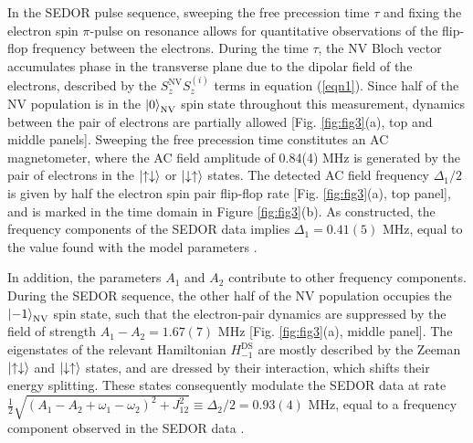 \documentclass[%
 reprint,
 amsmath,amssymb,
 aps,
]{revtex4-1}
\begin{document}
In the SEDOR pulse sequence, sweeping the free precession time $\tau$ and fixing the electron spin $\pi$-pulse on resonance allows for quantitative observations of the flip-flop frequency between the electrons. During the time $\tau$, the NV Bloch vector accumulates phase in the transverse plane due to the dipolar field of the electrons, described by the $S_{z}^{\text{NV}}S_{z}^{(i)}$ terms in equation (\ref{eqn1}). Since half of the NV population is in the $\ket{0}_{\text{NV}}$ spin state throughout this measurement, dynamics between the pair of electrons are partially allowed [Fig. \ref{fig:fig3}(a), top and middle panels]. Sweeping the free precession time constitutes an AC magnetometer, where the AC field amplitude of 0.84(4) MHz is generated by the pair of electrons in the $\ket{\uparrow\downarrow}$ or $\ket{\downarrow\uparrow}$ states. The detected AC field frequency $\Delta_{1}/2$ is given by half the electron spin pair flip-flop rate [Fig. \ref{fig:fig3}(a), top panel], and is marked in the time domain in Figure \ref{fig:fig3}(b). As constructed, the frequency components of the SEDOR data implies $\Delta_1=0.41(5)\text{ MHz}$, equal to the value found with the model parameters \cite{suppl}.

In addition, the parameters $A_{1}$ and $A_{2}$ contribute to other frequency components. During the SEDOR sequence, the other half of the NV population occupies the $\ket{-1}_{\text{NV}}$ spin state, such that the electron-pair dynamics are suppressed by the field of strength $A_{1} - A_{2}=1.67(7)\text{ MHz}$ [Fig. \ref{fig:fig3}(a), middle panel]. The eigenstates of the relevant Hamiltonian $H_{-1}^{\text{DS}}$ are mostly described by the Zeeman $\ket{\uparrow\downarrow}$ and $\ket{\downarrow\uparrow}$ states, and are dressed by their interaction, which shifts their energy splitting. These states consequently modulate the SEDOR data at rate $\frac{1}{2}\sqrt{(A_1-A_2+\omega_1-\omega_2)^2+J_{12}^2}\equiv\Delta_{2}/2=0.93(4)\text{ MHz}$, equal to a frequency component observed in the SEDOR data \cite{suppl}.
\end{document}
